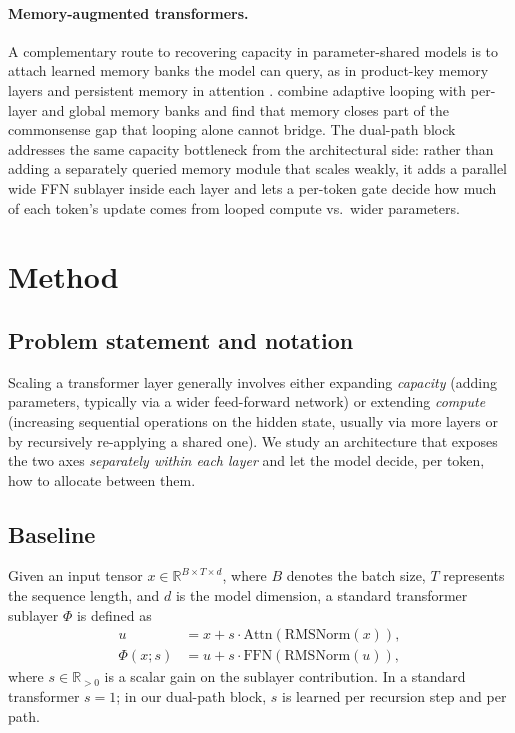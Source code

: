 \documentclass[11pt]{article}
\begin{document}
\paragraph{Memory-augmented transformers.}
A complementary route to recovering capacity in parameter-shared models is to attach learned memory banks the model can query, as in product-key memory layers \citep{lample2019large} and persistent memory in attention \citep{sukhbaatar2019augmenting}. \citet{frey-etal-2026-adaptive} combine adaptive looping with per-layer and global memory banks and find that memory closes part of the commonsense gap that looping alone cannot bridge. The dual-path block addresses the same capacity bottleneck from the architectural side: rather than adding a separately queried memory module that scales weakly, it adds a parallel wide FFN sublayer inside each layer and lets a per-token gate decide how much of each token's update comes from looped compute vs.\ wider parameters.
 

\section{Method}
\label{sec:method}

\subsection{Problem statement and notation}
\label{sec:method:problem}

Scaling a transformer layer generally involves either expanding \emph{capacity} (adding parameters, typically via a wider feed-forward network) or extending \emph{compute} (increasing sequential operations on the hidden state, usually via more layers or by recursively re-applying a shared one). We study an architecture that exposes the two axes \emph{separately within each layer} and let the model decide, per token, how to allocate between them.

\subsection{Baseline}
\label{sec:method:backbone}

Given an input tensor $x \in \mathbb{R}^{B \times T \times d}$, where $B$ denotes the batch size, $T$ represents the sequence length, and $d$ is the model dimension, a standard transformer sublayer $\Phi$ is defined as
\begin{align}
\label{eq:sublayer}
u &= x + s \cdot \mathrm{Attn}\!\left(\mathrm{RMSNorm}(x)\right), \nonumber\\
\Phi(x; s) &= u + s \cdot \mathrm{FFN}\!\left(\mathrm{RMSNorm}(u)\right),
\end{align}
where $s \in \mathbb{R}_{>0}$ is a scalar gain on the sublayer
contribution. In a standard transformer $s = 1$; in our dual-path
block, $s$ is learned per recursion step and per path.
\end{document}
